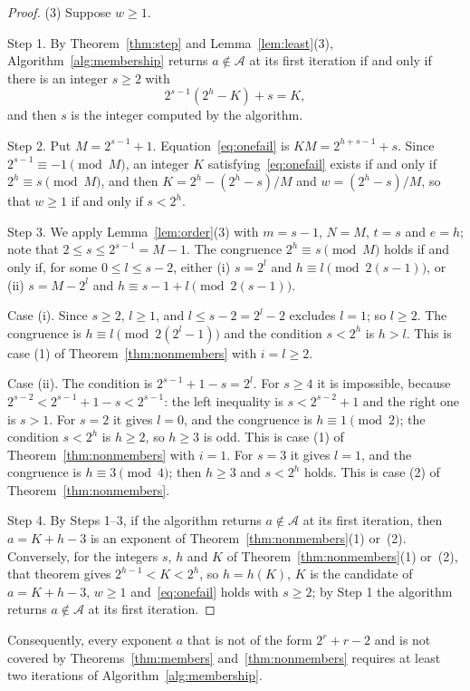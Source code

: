 \documentclass[11pt]{amsart}
\theoremstyle{definition}
\begin{document}
\begin{proof}
(3) Suppose $w\ge1$.

Step 1. By Theorem~\ref{thm:step} and Lemma~\ref{lem:least}(3), Algorithm~\ref{alg:membership} returns $a\notin\mathcal{A}$ at its first iteration if and only if there is an integer $s\ge2$ with
\begin{equation}
\label{eq:onefail}
2^{s-1}(2^h-K)+s=K,
\end{equation}
and then $s$ is the integer computed by the algorithm.

Step 2. Put $M=2^{s-1}+1$. Equation~\eqref{eq:onefail} is $KM=2^{h+s-1}+s$. Since $2^{s-1}\equiv-1\pmod M$, an integer $K$ satisfying~\eqref{eq:onefail} exists if and only if $2^h\equiv s\pmod M$, and then $K=2^h-(2^h-s)/M$ and $w=(2^h-s)/M$, so that $w\ge1$ if and only if $s<2^h$.

Step 3. We apply Lemma~\ref{lem:order}(3) with $m=s-1$, $N=M$, $t=s$ and $e=h$; note that $2\le s\le2^{s-1}=M-1$. The congruence $2^h\equiv s\pmod M$ holds if and only if, for some $0\le l\le s-2$, either (i) $s=2^l$ and $h\equiv l\pmod{2(s-1)}$, or (ii) $s=M-2^l$ and $h\equiv s-1+l\pmod{2(s-1)}$.

Case (i). Since $s\ge2$, $l\ge1$, and $l\le s-2=2^l-2$ excludes $l=1$; so $l\ge2$. The congruence is $h\equiv l\pmod{2(2^l-1)}$ and the condition $s<2^h$ is $h>l$. This is case (1) of Theorem~\ref{thm:nonmembers} with $i=l\ge2$.

Case (ii). The condition is $2^{s-1}+1-s=2^l$. For $s\ge4$ it is impossible, because $2^{s-2}<2^{s-1}+1-s<2^{s-1}$: the left inequality is $s<2^{s-2}+1$ and the right one is $s>1$. For $s=2$ it gives $l=0$, and the congruence is $h\equiv1\pmod2$; the condition $s<2^h$ is $h\ge2$, so $h\ge3$ is odd. This is case (1) of Theorem~\ref{thm:nonmembers} with $i=1$. For $s=3$ it gives $l=1$, and the congruence is $h\equiv3\pmod4$; then $h\ge3$ and $s<2^h$ holds. This is case (2) of Theorem~\ref{thm:nonmembers}.

Step 4. By Steps 1--3, if the algorithm returns $a\notin\mathcal{A}$ at its first iteration, then $a=K+h-3$ is an exponent of Theorem~\ref{thm:nonmembers}(1) or~(2). Conversely, for the integers $s$, $h$ and $K$ of Theorem~\ref{thm:nonmembers}(1) or~(2), that theorem gives $2^{h-1}<K<2^h$, so $h=h(K)$, $K$ is the candidate of $a=K+h-3$, $w\ge1$ and~\eqref{eq:onefail} holds with $s\ge2$; by Step 1 the algorithm returns $a\notin\mathcal{A}$ at its first iteration.
\end{proof}

Consequently, every exponent $a$ that is not of the form $2^r+r-2$ and is not covered by Theorems~\ref{thm:members} and~\ref{thm:nonmembers} requires at least two iterations of Algorithm~\ref{alg:membership}.
\end{document}
